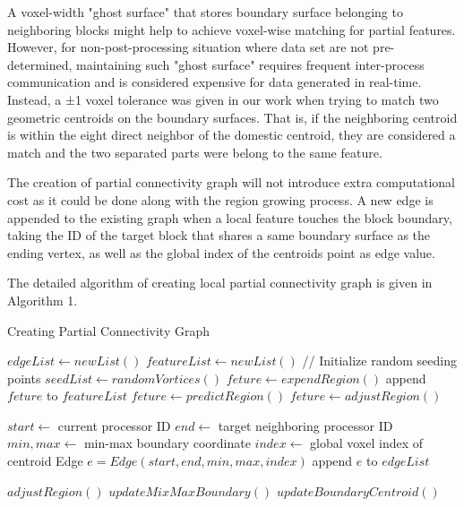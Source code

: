 \documentclass[10pt, conference, compsocconf]{IEEEtran}
\begin{document}
A voxel-width "ghost surface" that stores boundary surface belonging to neighboring blocks might help to achieve voxel-wise matching for partial features. However, for non-post-processing situation where data set are not pre-determined, maintaining such "ghost surface" requires frequent inter-process communication and is considered expensive for data generated in real-time. Instead, a ±1 voxel tolerance was given in our work when trying to match two geometric centroids on the boundary surfaces. That is, if the neighboring centroid is within the eight direct neighbor of the domestic centroid, they are considered a match and the two separated parts were belong to the same feature.

The creation of partial connectivity graph will not introduce extra computational cost as it could be done along with the region growing process. A new edge is appended to the existing graph when a local feature touches the block boundary, taking the ID of the target block that shares a same boundary surface as the ending vertex, as well as the global index of the centroids point as edge value.

The detailed algorithm of creating local partial connectivity graph is given in Algorithm 1.
\begin{algorithm}
\caption{Creating Partial Connectivity Graph}
\begin{algorithmic}[1]
\STATE $edgeList \leftarrow new List()$
\STATE $featureList \leftarrow new List()$
	\STATE // Initialize random seeding points
	\STATE $seedList \leftarrow randomVortices()$
		\STATE $feture \leftarrow expendRegion()$
		\STATE append $feture$ to $featureList$
	\ENDFOR	
\ELSE
		\STATE $feture \leftarrow predictRegion()$
		\STATE $feture \leftarrow adjustRegion()$	
		
		\STATE $start \leftarrow$ current processor ID
		\STATE $end \leftarrow$ target neighboring processor ID
		\STATE $min,max \leftarrow$ min-max boundary coordinate
		\STATE $index \leftarrow$ global voxel index of centroid
		\STATE Edge $e = Edge(start, end, min, max, index)$
		\STATE append $e$ to $edgeList$
	\ENDFOR
\ENDIF
\end{algorithmic}
\begin{algorithmic} \STATE \end{algorithmic}	%
\begin{algorithmic}[1]
\STATE $adjustRegion()$
		\STATE $updateMixMaxBoundary()$
		\STATE $updateBoundaryCentroid()$
	\ENDIF
\end{algorithmic}
\end{algorithm}
\end{document}
